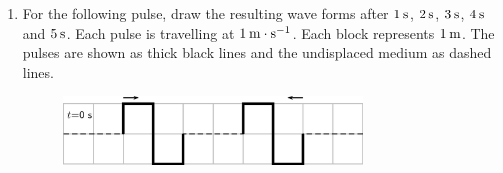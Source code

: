 \begin{enumerate}[noitemsep, label=\textbf{\arabic*}. ]
    \addtocounter{footnote}{-0}
            \label{m38802*uid59}\item For the following pulse, draw the resulting wave forms after \begin{math}1\phantom{\rule{2pt}{0ex}}\mathrm{s}\end{math}, \begin{math}2\phantom{\rule{2pt}{0ex}}\mathrm{s}\end{math}, \begin{math}3\phantom{\rule{2pt}{0ex}}\mathrm{s}\end{math}, \begin{math}4\phantom{\rule{2pt}{0ex}}\mathrm{s}\end{math} and \begin{math}5\phantom{\rule{2pt}{0ex}}\mathrm{s}\end{math}. Each pulse is travelling at \begin{math}1\phantom{\rule{2pt}{0ex}}\mathrm{m}\ensuremath{\cdot}\mathrm{s}{}^{-1}\end{math}. Each block represents \begin{math}1\phantom{\rule{2pt}{0ex}}\mathrm{m}\end{math}. The pulses are shown as thick black lines and the undisplaced medium as dashed lines.
    \setcounter{subfigure}{0}


	\begin{figure}[H] %
    \begin{center}
    \label{m38802*id316512!!!underscore!!!media}\label{m38802*id316512!!!underscore!!!printimage}\includegraphics[width=300px]{col11305.imgs/m38802_PG10C4_027.png} %
        
      \vspace{2pt}
    \vspace{.1in}
    
    \end{center}

 \end{figure}   


\end{enumerate}

